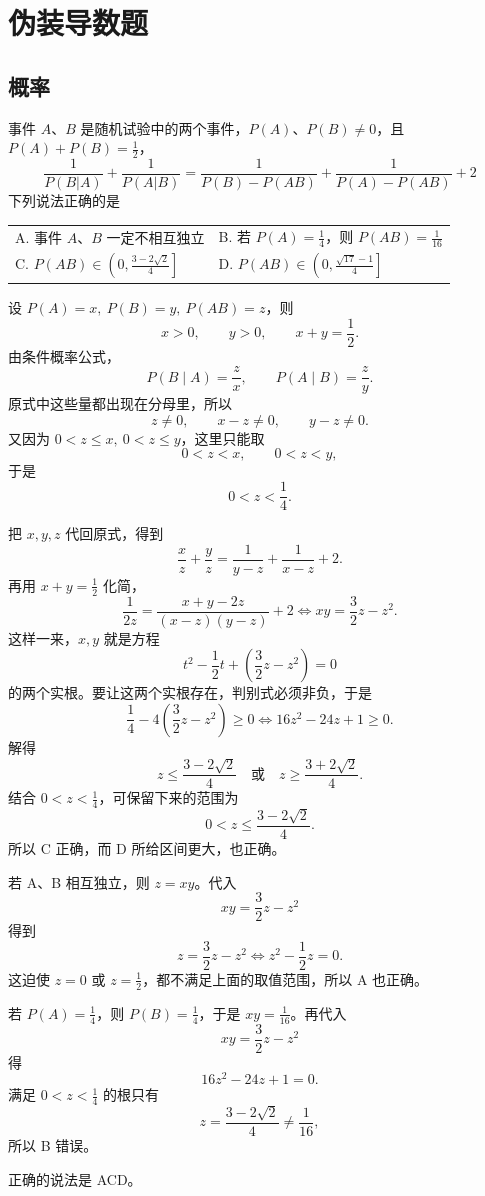 
\chapter{伪装导数题}
\section{概率}
\begin{example}
事件 $A$、$B$ 是随机试验中的两个事件，$P(A)$、$P(B) \neq 0$，且 $P(A)+P(B)=\frac{1}{2}$，\[\frac{1}{P(B|A)}+\frac{1}{P(A|B)}=\frac{1}{P(B)-P(AB)}+\frac{1}{P(A)-P(AB)}+2\]下列说法正确的是\\
\begin{tabular}{@{}p{} p{}@{}}
A. 事件 $A$、$B$ 一定不相互独立 & B. 若 $P(A)=\frac{1}{4}$，则 $P(AB)=\frac{1}{16}$ \\
C. $P(AB)\in\left(0,\frac{3-2\sqrt{2}}{4}\right]$ & D. $P(AB)\in\left(0,\frac{\sqrt{17}-1}{4}\right]$
\end{tabular}
\end{example}
\begin{solution}
设 $P(A)=x,\ P(B)=y,\ P(AB)=z$，则
\[
x>0,\qquad y>0,\qquad x+y=\frac12.
\]
由条件概率公式，
\[
P(B\mid A)=\frac{z}{x},\qquad P(A\mid B)=\frac{z}{y}.
\]
原式中这些量都出现在分母里，所以
\[
z\ne0,\qquad x-z\ne0,\qquad y-z\ne0.
\]
又因为 $0<z\le x,\ 0<z\le y$，这里只能取
\[
0<z<x,\qquad 0<z<y,
\]
于是
\[
0<z<\frac14.
\]

把 $x,y,z$ 代回原式，得到
\[
\frac{x}{z}+\frac{y}{z}=\frac1{y-z}+\frac1{x-z}+2.
\]
再用 $x+y=\frac12$ 化简，
\[
\frac1{2z}=\frac{x+y-2z}{(x-z)(y-z)}+2
\iff
xy=\frac32z-z^2.
\]
这样一来，$x,y$ 就是方程
\[
t^2-\frac12t+\left(\frac32z-z^2\right)=0
\]
的两个实根。要让这两个实根存在，判别式必须非负，于是
\[
\frac14-4\left(\frac32z-z^2\right)\ge0
\iff
16z^2-24z+1\ge0.
\]
解得
\[
z\le \frac{3-2\sqrt2}{4}\quad\text{或}\quad z\ge \frac{3+2\sqrt2}{4}.
\]
结合 $0<z<\frac14$，可保留下来的范围为
\[
0<z\le \frac{3-2\sqrt2}{4}.
\]
所以 C 正确，而 D 所给区间更大，也正确。

若 A、B 相互独立，则 $z=xy$。代入
\[
xy=\frac32z-z^2
\]
得到
\[
z=\frac32z-z^2
\iff
z^2-\frac12z=0.
\]
这迫使 $z=0$ 或 $z=\frac12$，都不满足上面的取值范围，所以 A 也正确。

若 $P(A)=\frac14$，则 $P(B)=\frac14$，于是 $xy=\frac1{16}$。再代入
\[
xy=\frac32z-z^2
\]
得
\[
16z^2-24z+1=0.
\]
满足 $0<z<\frac14$ 的根只有
\[
z=\frac{3-2\sqrt2}{4}\ne \frac1{16},
\]
所以 B 错误。

正确的说法是 ACD。
\end{solution}


